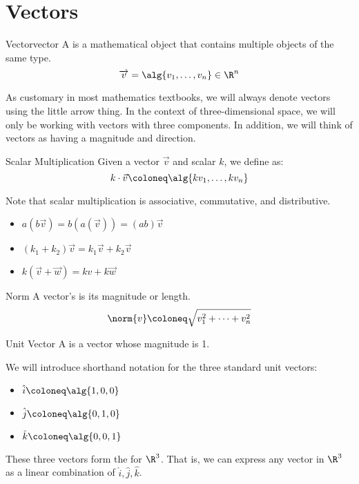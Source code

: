 \section{Vectors}

\begin{dfnbox}{Vector}{vector}
    A  is a mathematical object that contains multiple objects of the same type.
    \tcblower
    \[ \overrightarrow{v} = \alg{v_1, \ldots, v_n} \in \R^n \]
\end{dfnbox}

As customary in most mathematics textbooks, we will always denote vectors using the little arrow thing. In the context of three-dimensional space, we will only be working with vectors with three components. In addition, we will think of vectors as having a magnitude and direction.

\begin{dfnbox}{Scalar Multiplication}{}
    Given a vector $\vec{v}$ and scalar $k$, we define  as:
    \[ k \cdot \vec{v} \coloneq \alg{kv_1, \ldots, kv_n} \]
\end{dfnbox}

Note that scalar multiplication is associative, commutative, and distributive.
\begin{itemize}
    \item $a(b\vec{v}) = b(a(\vec{v})) = (ab) \vec{v}$
    \item $(k_1 + k_2) \vec{v} = k_1 \vec{v} + k_2 \vec{v}$
    \item $k (\vec{v} + \vec{w}) = k{v} + k\vec{w}$
\end{itemize}

\begin{dfnbox}{Norm}{}
    A vector's  is its magnitude or length.
    \tcblower
    \[ \norm{v} \coloneq \sqrt{v_1^2 + \cdots + v_n^2} \]
\end{dfnbox}

\begin{dfnbox}{Unit Vector}{}
    A  is a vector whose magnitude is 1.
\end{dfnbox}

We will introduce shorthand notation for the three standard unit vectors:
\begin{itemize}
    \item $\hat{i} \coloneq \alg{1,0,0}$
    \item $\hat{j} \coloneq \alg{0,1,0}$
    \item $\hat{k} \coloneq \alg{0,0,1}$
\end{itemize}
These three vectors form the  for $\R^3$. That is, we can express any vector in $\R^3$ as a linear combination of $\hat{i}, \hat{j}, \hat{k}$.

